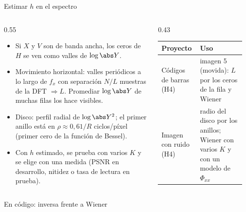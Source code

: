 \documentclass[aspectratio=169,11pt]{beamer}
\begin{document}
\begin{frame}{Estimar $h$ en el espectro}
  \footnotesize
  \begin{columns}[T]
    \begin{column}{0.55\textwidth}
      \begin{itemize}
        \item Si $X$ y $V$ son de banda ancha, los ceros de $H$ se ven como \alert{valles} de $\log\abs Y$.
        \item Movimiento horizontal: valles periódicos a lo largo de $f_x$ con separación $N/L$ muestras de la DFT $\Rightarrow L$. Promediar $\log\abs Y$ de muchas filas los hace visibles.
        \item Disco: perfil \alert{radial} de $\log\abs Y^2$; el primer anillo está en $\rho\approx0{,}61/R$ ciclos/píxel (primer cero de la función de Bessel).
        \item Con $h$ estimado, se prueba con varios $K$ y se elige con una medida (PSNR en desarrollo, nitidez o tasa de lectura en prueba).
      \end{itemize}
    \end{column}
    \begin{column}{0.43\textwidth}
      \scriptsize
      \begin{tabular}{@{}p{0.4\linewidth}p{0.52\linewidth}@{}}
        \toprule
        Proyecto & Uso \\ \midrule
        Códigos de barras (H4) & imagen 5 (movida): $L$ por los ceros de la fila y Wiener \\
        Imagen con ruido (H4) & radio del disco por los anillos; Wiener con varios $K$ y con un modelo de $\Phi_{xx}$ \\
        \bottomrule
      \end{tabular}
    \end{column}
  \end{columns}
\end{frame}

\begin{frame}{En código: inversa frente a Wiener}
\end{frame}
\end{document}
